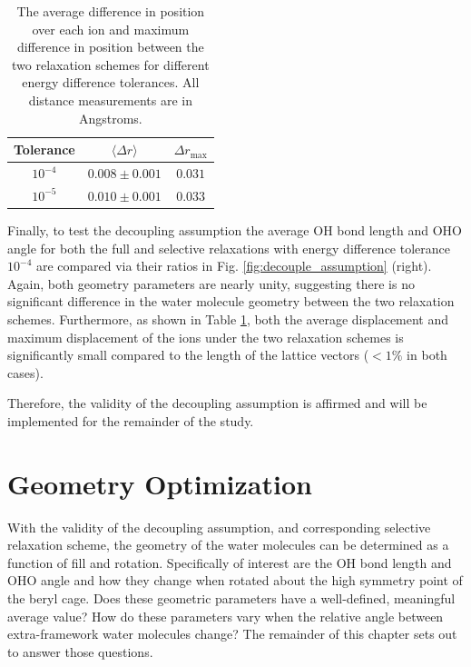         \begin{table}[]
            \centering
            \begin{tabular}{c|c|c}
               Tolerance  & $\langle \Delta r \rangle$ & $\Delta r_\text{max}$  \\
               \hline
               \hline
                $10^{-4}$ & $0.008\pm 0.001$ & $0.031$  \\ 
                $10^{-5}$ & $0.010\pm0.001$& $0.033$ \\ 
            \end{tabular}
            \caption{The average difference in position over each ion and maximum difference in position between the two relaxation schemes for different energy difference tolerances. All distance measurements are in Angstroms.}
            \label{tab:ediff_r_diff}
        \end{table}
        
        Finally, to test the decoupling assumption the average OH bond length and OHO angle for both the full and selective relaxations with energy difference tolerance $10^{-4}$ are compared via their ratios in Fig. \ref{fig:decouple_assumption} (right). Again, both geometry parameters are nearly unity, suggesting there is no significant difference in the water molecule geometry between the two relaxation schemes. Furthermore, as shown in Table \ref{tab:ediff_r_diff}, both the average displacement and maximum displacement of the ions under the two relaxation schemes is significantly small compared to the length of the lattice vectors ($<1\%$ in both cases). 
        
        Therefore, the validity of the decoupling assumption is affirmed and will be implemented for the remainder of the study.
    \section{Geometry Optimization}
    \label{sec:geo_opt}
    
    With the validity of the decoupling assumption, and corresponding selective relaxation scheme, the geometry of the water molecules can be determined as a function of fill and rotation. Specifically of interest are the OH bond length and OHO angle and how they change when rotated about the high symmetry point of the beryl cage. Does these geometric parameters have a well-defined, meaningful average value? How do these parameters vary when the relative angle between extra-framework water molecules change? The remainder of this chapter sets out to answer those questions.
    
